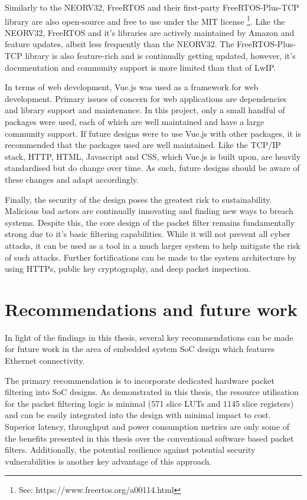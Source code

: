Similarly to the NEORV32, FreeRTOS and their first-party FreeRTOS-Plus-TCP library are also open-source and free to use under the MIT license \footnote[2]{See: https://www.freertos.org/a00114.html}. Like the NEORV32, FreeRTOS and it's libraries are actively maintained by Amazon and feature updates, albeit less frequently than the NEORV32. The FreeRTOS-Plus-TCP library is also feature-rich and is continually getting updated, however, it's documentation and community support is more limited than that of LwIP.



In terms of web development, Vue.js was used as a framework for web development. Primary issues of concern for web applications are dependencies and library support and maintenance. In this project, only a small handful of packages were used, each of which are well maintained and have a large community support. If future designs were to use Vue.js with other packages, it is recommended that the packages used are well maintained. Like the TCP/IP stack, HTTP, HTML, Javascript and CSS, which Vue.js is built upon, are heavily standardised but do change over time. As such, future designs should be aware of these changes and adapt accordingly.


Finally, the security of the design poses the greatest risk to sustainability. Malicious bad actors are continually innovating and finding new ways to breach systems. Despite this, the core design of the packet filter remains fundamentally strong due to it's basic filtering capabilities. While it will not prevent all cyber attacks, it can be used as a tool in a much larger system to help mitigate the risk of such attacks. Further fortifications can be made to the system architecture by using HTTPs, public key cryptography, and deep packet inspection.





\section{Recommendations and future work}

In light of the findings in this thesis, several key recommendations can be made for future work in the area of embedded system SoC design which features Ethernet connectivity.

The primary recommendation is to incorporate dedicated hardware packet filtering into SoC designs. As demonstrated in this thesis, the resource utilisation for the packet filtering logic is minimal (571 slice LUTs and 1145 slice registers) and can be easily integrated into the design with minimal impact to cost. Superior latency, throughput and power consumption metrics are only some of the benefits presented in this thesis over the conventional software based packet filters. Additionally, the potential resilience against potential security vulnerabilities is another key advantage of this approach.

